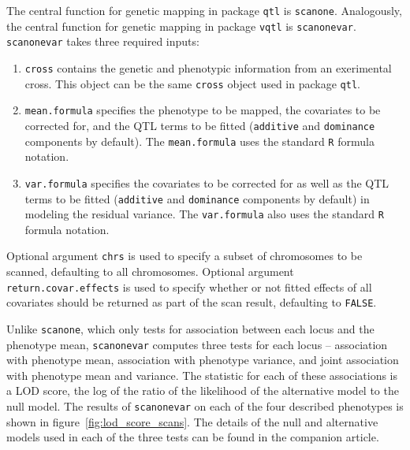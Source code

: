 \documentclass[9pt,twocolumn,twoside]{gsag3jnl}
\begin{document}
The central function for genetic mapping in package \texttt{qtl} is \texttt{scanone}.
Analogously, the central function for genetic mapping in package \texttt{vqtl} is \texttt{scanonevar}.
\texttt{scanonevar} takes three required inputs:

\begin{enumerate}
    \item \texttt{cross} contains the genetic and phenotypic information from an exerimental cross.  This object can be the same \texttt{cross} object used in package \texttt{qtl}.
    \item \texttt{mean.formula} specifies the phenotype to be mapped, the covariates to be corrected for, and the QTL terms to be fitted (\texttt{additive} and \texttt{dominance} components by default).  The \texttt{mean.formula} uses the standard \texttt{R} formula notation.
    \item \texttt{var.formula} specifies the covariates to be corrected for as well as the QTL terms to be fitted (\texttt{additive} and \texttt{dominance} components by default) in modeling the residual variance.  The \texttt{var.formula} also uses the standard \texttt{R} formula notation.
\end{enumerate}

Optional argument \texttt{chrs} is used to specify a subset of chromosomes to be scanned, defaulting to all chromosomes.
Optional argument \texttt{return.covar.effects} is used to specify whether or not fitted effects of all covariates should be returned as part of the scan result, defaulting to \texttt{FALSE}.


Unlike \texttt{scanone}, which only tests for association between each locus and the phenotype mean, \texttt{scanonevar} computes three tests for each locus -- association with phenotype mean, association with phenotype variance, and joint association with phenotype mean and variance.
The statistic for each of these associations is a LOD score, the log of the ratio of the likelihood of the alternative model to the null model.
The results of \texttt{scanonevar} on each of the four described phenotypes is shown in figure~\ref{fig:lod_score_scans}.
The details of the null and alternative models used in each of the three tests can be found in the companion article.
\end{document}
